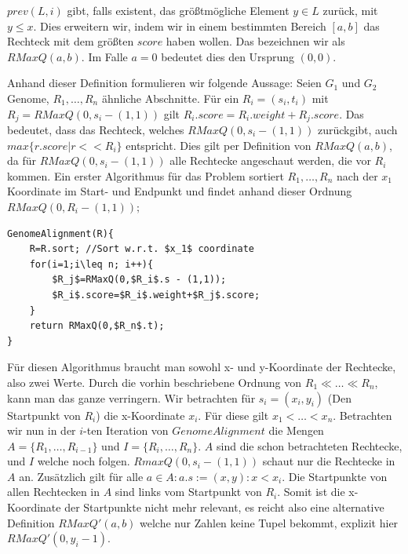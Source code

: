 \begin{definition} $prev(L,i)$ gibt, falls existent, das größtmögliche Element $y\in L$ zurück, mit $y\leq x$. Dies erweitern wir, indem wir in einem bestimmten Bereich $[a,b]$ das Rechteck mit dem größten $score$ haben wollen. Das bezeichnen wir als $RMaxQ(a,b)$. Im Falle $a=0$ bedeutet dies den Ursprung $(0,0)$.
\end{definition}

Anhand dieser Definition formulieren wir folgende Aussage:
Seien $G_1$ und $G_2$ Genome, $R_1, \dots, R_n$ ähnliche Abschnitte. Für ein $R_i=(s_i,t_i)$ mit $R_j=RMaxQ(0,s_i -(1,1))$ gilt $R_i.score=R_i.weight+R_j.score$. Das bedeutet, dass das Rechteck, welches $RMaxQ(0,s_i-(1,1))$ zurückgibt, auch $max\{r.score | r << R_i\}$ entspricht. Dies gilt per Definition von $RMaxQ(a,b)$,  da für $RMaxQ(0,s_i-(1,1))$ alle Rechtecke angeschaut werden, die vor $R_i$ kommen. Ein erster Algorithmus für das Problem sortiert $R_1,\dots ,R_n$ nach der $x_1$ Koordinate im Start- und Endpunkt und findet anhand dieser Ordnung $RMaxQ(0,R_i-(1,1));$
\begin{lstlisting}[mathescape]
GenomeAlignment(R){
    R=R.sort; //Sort w.r.t. $x_1$ coordinate
    for(i=1;i\leq n; i++){
        $R_j$=RMaxQ(0,$R_i$.s - (1,1));
        $R_i$.score=$R_i$.weight+$R_j$.score;
    }
    return RMaxQ(0,$R_n$.t);
}
\end{lstlisting}

\begin{bemerkung}
Für diesen Algorithmus braucht man sowohl x- und y-Koordinate der Rechtecke, also zwei Werte. Durch die vorhin beschriebene Ordnung von $R_1 \ll \dots \ll R_n$, kann man das ganze verringern. Wir betrachten für $s_i=(x_i,y_i)$ (Den Startpunkt von $R_i$) die x-Koordinate $x_i$. Für diese gilt $x_1 < \dots < x_n$. Betrachten wir nun in der $i$-ten Iteration von $GenomeAlignment$ die Mengen $A=\{R_1,\dots , R_{i-1}\}$ und $I=\{R_i,\dots , R_n\}$. $A$ sind die schon betrachteten Rechtecke, und $I$ welche noch folgen. $RmaxQ(0,s_i-(1,1))$ schaut nur die Rechtecke in $A$ an. Zusätzlich gilt für alle $a \in A: a.s:=(x,y): x < x_i $. Die Startpunkte von allen Rechtecken in $A$ sind links vom Startpunkt von $R_i$. Somit ist die x-Koordinate der Startpunkte nicht mehr relevant, es reicht also eine alternative Definition $RMaxQ'(a,b)$ welche nur Zahlen keine Tupel bekommt, explizit hier $RMaxQ'(0,y_i-1)$.
\end{bemerkung}


